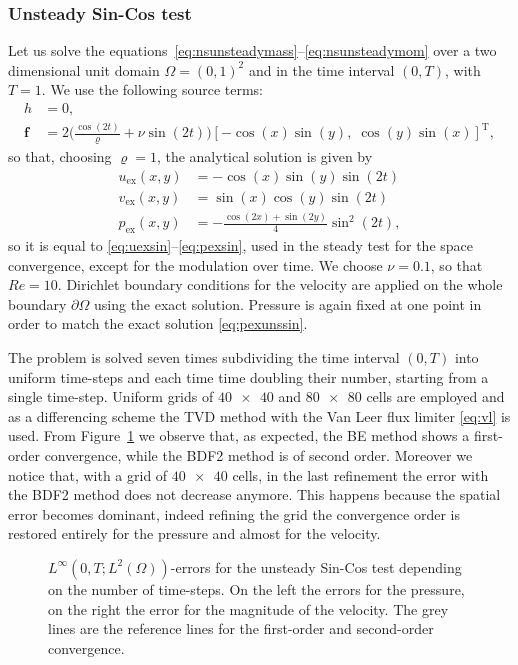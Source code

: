 \subsubsection{Unsteady Sin-Cos test}
Let us solve the equations~\eqref{eq:nsunsteadymass}--\eqref{eq:nsunsteadymom} 
over a two dimensional unit domain $\Omega=(0,1)^2$ and in the time interval 
$(0,T)$, with $T=1$. We use the following source terms:
\begin{align}
h &= 0,\\
\mathbf{f} &= 2\Big(\frac{\cos(2t)}{\varrho} + \nu \sin(2t)\Big)[- \cos(x) 
\sin(y), \; 
\cos(y) \sin(x)]^\mathrm{T},
\end{align}
so that, choosing $\varrho=1$, the analytical solution is given by
\begin{align}
\label{eq:uexunssin}	u_\text{ex}(x,y) &= -\cos(x)\sin(y)\sin(2t)\\
v_\text{ex}(x,y) &= \sin(x)\cos(y)\sin(2t)\\
\label{eq:pexunssin}	p_\text{ex}(x,y) &= 
-\frac{\cos(2x)+\sin(2y)}{4}\sin^2(2t),
\end{align}
so it is equal to \eqref{eq:uexsin}--\eqref{eq:pexsin}, used in the steady test 
for the space convergence, except for the modulation over time. We choose 
$\nu=0.1$, so that $Re=10$. Dirichlet boundary conditions for the velocity are 
applied on the whole boundary $\partial \Omega$ using the exact solution. 
Pressure is again fixed  at one point in order to match the exact solution 
\eqref{eq:pexunssin}.

The problem is solved seven times subdividing the time interval $(0,T)$ into 
uniform time-steps and each time time doubling their number, starting from a 
single time-step. Uniform grids of $\num{40x40}$ and $\num{80x80}$ cells are 
employed and as a differencing scheme the TVD method with the Van Leer flux 
limiter \eqref{eq:vl} is used. From Figure~\ref{fig:timeerr} we observe that, 
as expected, the BE method shows a first-order convergence, while the BDF2 
method is of second order. Moreover we notice that, with a grid of 
$\num{40x40}$ cells, in the last refinement the error with the BDF2 method does 
not decrease anymore. This happens because the spatial error becomes 
dominant, indeed refining the grid the convergence order is restored entirely 
for the pressure and almost for the velocity.
\begin{figure}
	\centering
	\subfloat{}
	\subfloat{}
	\caption[$L^\infty(0,T;L^2(\Omega))$-errors for the unsteady Sin-Cos 
	test]{$L^\infty(0,T;L^2(\Omega))$-errors for the unsteady Sin-Cos test 
	depending on the number of time-steps. On the left the errors for the 
	pressure, on the right the error for the magnitude of the velocity. The 
	grey lines are the reference lines for the first-order and second-order 
	convergence.}
	\label{fig:timeerr}
\end{figure}
%
